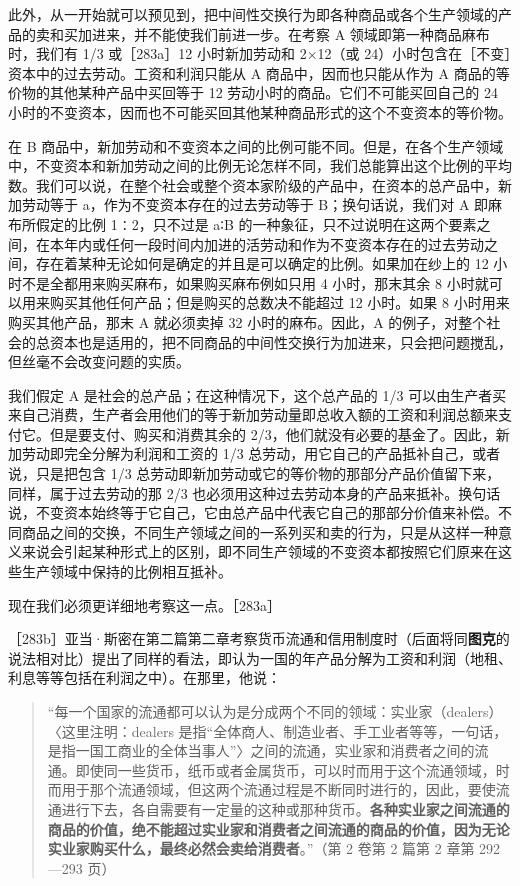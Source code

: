 此外，从一开始就可以预见到，把中间性交换行为即各种商品或各个生产领域的产品的卖和买加进来，并不能使我们前进一步。在考察 A 领域即第一种商品麻布时，我们有 1/3 或［283a］12 小时新加劳动和 2×12（或 24）小时包含在［不变］资本中的过去劳动。工资和利润只能从 A 商品中，因而也只能从作为 A 商品的等价物的其他某种产品中买回等于 12 劳动小时的商品。它们不可能买回自己的 24 小时的不变资本，因而也不可能买回其他某种商品形式的这个不变资本的等价物。

在 B 商品中，新加劳动和不变资本之间的比例可能不同。但是，在各个生产领域中，不变资本和新加劳动之间的比例无论怎样不同，我们总能算出这个比例的平均数。我们可以说，在整个社会或整个资本家阶级的产品中，在资本的总产品中，新加劳动等于 a，作为不变资本存在的过去劳动等于 B；换句话说，我们对 A 即麻布所假定的比例 1∶2，只不过是 a∶B 的一种象征，只不过说明在这两个要素之间，在本年内或任何一段时间内加进的活劳动和作为不变资本存在的过去劳动之间，存在着某种无论如何是确定的并且是可以确定的比例。如果加在纱上的 12 小时不是全都用来购买麻布，如果购买麻布例如只用 4 小时，那末其余 8 小时就可以用来购买其他任何产品；但是购买的总数决不能超过 12 小时。如果 8 小时用来购买其他产品，那末 A 就必须卖掉 32 小时的麻布。因此，A 的例子，对整个社会的总资本也是适用的，把不同商品的中间性交换行为加进来，只会把问题搅乱，但丝毫不会改变问题的实质。

我们假定 A 是社会的总产品；在这种情况下，这个总产品的 1/3 可以由生产者买来自己消费，生产者会用他们的等于新加劳动量即总收入额的工资和利润总额来支付它。但是要支付、购买和消费其余的 2/3，他们就没有必要的基金了。因此，新加劳动即完全分解为利润和工资的 1/3 总劳动，用它自己的产品抵补自己，或者说，只是把包含 1/3 总劳动即新加劳动或它的等价物的那部分产品价值留下来，同样，属于过去劳动的那 2/3 也必须用这种过去劳动本身的产品来抵补。换句话说，不变资本始终等于它自己，它由总产品中代表它自己的那部分价值来补偿。不同商品之间的交换，不同生产领域之间的一系列买和卖的行为，只是从这样一种意义来说会引起某种形式上的区别，即不同生产领域的不变资本都按照它们原来在这些生产领域中保持的比例相互抵补。

现在我们必须更详细地考察这一点。［283a］


［283b］亚当·斯密在第二篇第二章考察货币流通和信用制度时（后面将同\textbf{图克}的说法相对比）提出了同样的看法，即认为一国的年产品分解为工资和利润（地租、利息等等包括在利润之中）。在那里，他说：

\begin{quote}“每一个国家的流通都可以认为是分成两个不同的领域：实业家（dealers）〈这里注明：dealers 是指“全体商人、制造业者、手工业者等等，一句话，是指一国工商业的全体当事人”〉之间的流通，实业家和消费者之间的流通。即使同一些货币，纸币或者金属货币，可以时而用于这个流通领域，时而用于那个流通领域，但这两个流通过程是不断同时进行的，因此，要使流通进行下去，各自需要有一定量的这种或那种货币。\textbf{各种实业家之间流通的商品的价值，绝不能超过实业家和消费者之间流通的商品的价值，因为无论实业家购买什么，最终必然会卖给消费者}。”（第 2 卷第 2 篇第 2 章第 292—293 页）\end{quote}

